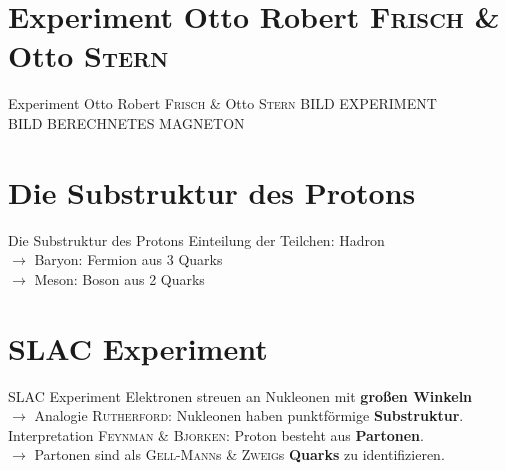 \documentclass[t,9pt]{beamer}
\begin{document}
        \section{Experiment Otto Robert \textsc{Frisch} \& Otto \textsc{Stern}} 
        \begin{frame}{Experiment Otto Robert \textsc{Frisch} \& Otto \textsc{Stern}} 
                BILD EXPERIMENT\\BILD BERECHNETES MAGNETON
        \end{frame}

        \section{Die Substruktur des Protons}
        \begin{frame}{Die Substruktur des Protons}
                Einteilung der Teilchen: Hadron %
                \\\vspace{.1cm} $\rightarrow $ Baryon: Fermion aus 3 Quarks
                \\ $\rightarrow $ Meson: Boson aus 2 Quarks
        \end{frame}

        \section{SLAC Experiment}
        \begin{frame}{SLAC Experiment}
                \pause
                Elektronen streuen an Nukleonen mit \textbf{großen Winkeln} %
                \\\vspace{.1cm} $\rightarrow $ Analogie \textsc{Rutherford}: Nukleonen haben punktförmige \textbf{Substruktur}. 
                \pause
                \\\vspace{.5cm} Interpretation \textsc{Feynman} \& \textsc{Bjorken}: Proton besteht aus \textbf{Partonen}.
                \\\vspace{.1cm} $\rightarrow $ Partonen sind als \textsc{Gell-Mann}s \& \textsc{Zweig}s \textbf{Quarks} zu identifizieren. %
        \end{frame} 
\end{document}
